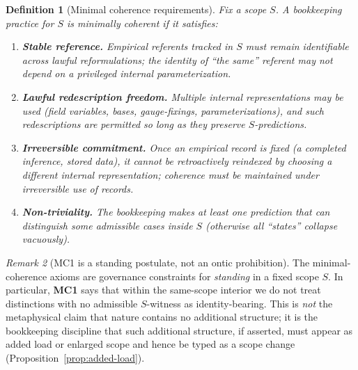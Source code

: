 \documentclass[11pt]{article}
\newtheorem{definition}{Definition}[section]
\theoremstyle{remark}
\newtheorem{remark}[definition]{Remark}
\begin{document}
\begin{definition}[Minimal coherence requirements]\label{def:coherence}
Fix a scope $S$.
A bookkeeping practice for $S$ is \emph{minimally coherent} if it satisfies:
\begin{enumerate}[label=(\textbf{MC\arabic*}),leftmargin=2.8em]
\item \textbf{Stable reference.} Empirical referents tracked in $S$ must remain identifiable across lawful
reformulations; the identity of ``the same'' referent may not depend on a privileged internal
parameterization.
\item \textbf{Lawful redescription freedom.} Multiple internal representations may be used (field variables,
bases, gauge-fixings, parameterizations), and such redescriptions are permitted so long as they preserve
$S$-predictions.
\item \textbf{Irreversible commitment.} Once an empirical record is fixed (a completed inference, stored data),
it cannot be retroactively reindexed by choosing a different internal representation; coherence must be
maintained under irreversible use of records.
\item \textbf{Non-triviality.} The bookkeeping makes at least one prediction that can distinguish some admissible
cases inside $S$ (otherwise all ``states'' collapse vacuously).
\end{enumerate}
\end{definition}

\begin{remark}[MC1 is a standing postulate, not an ontic prohibition]\label{rem:mc1-standing}
The minimal-coherence axioms are governance constraints for \emph{standing} in a fixed scope $S$.
In particular, \textbf{MC1} says that within the same-scope interior we do not treat distinctions with no admissible
$S$-witness as identity-bearing.
This is \emph{not} the metaphysical claim that nature contains no additional structure; it is the bookkeeping
discipline that such additional structure, if asserted, must appear as added load or enlarged scope and hence be
typed as a scope change (Proposition~\ref{prop:added-load}).
\end{remark}
\end{document}
